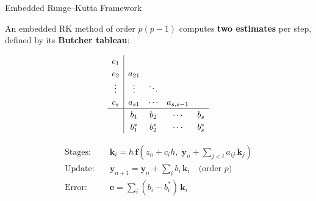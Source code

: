 \documentclass[aspectratio=169, 11pt]{beamer}
\newcommand{\bvec}[1]{\mathbf{#1}}
\begin{document}
\begin{frame}{Embedded Runge--Kutta Framework}

An embedded RK method of order $p(p{-}1)$ computes \textbf{two estimates}
per step, defined by its \textbf{Butcher tableau}:

\begin{equation*}
  \renewcommand{\arraystretch}{1.2}
  \begin{array}{c|cccc}
    c_1    & & & & \\
    c_2    & a_{21} & & & \\
    \vdots & \vdots & \ddots & & \\
    c_s    & a_{s1} & \cdots & a_{s,s-1} & \\
    \hline
           & b_1 & b_2 & \cdots & b_s \\
           & b^*_1 & b^*_2 & \cdots & b^*_s
  \end{array}
\end{equation*}

\begin{align*}
  \text{Stages:}\quad & \bvec{k}_i = h\,\bvec{f}\!\left(z_n + c_i h,\;
    \bvec{y}_n + \textstyle\sum_{j<i} a_{ij}\,\bvec{k}_j\right) \\[4pt]
  \text{Update:}\quad & \bvec{y}_{n+1} = \bvec{y}_n +
    \textstyle\sum_{i} b_i\,\bvec{k}_i \quad\text{(order $p$)} \\[4pt]
  \text{Error:}\quad  & \bvec{e} = \textstyle\sum_{i}(b_i - b^*_i)\,\bvec{k}_i
\end{align*}
\end{frame}
\end{document}
